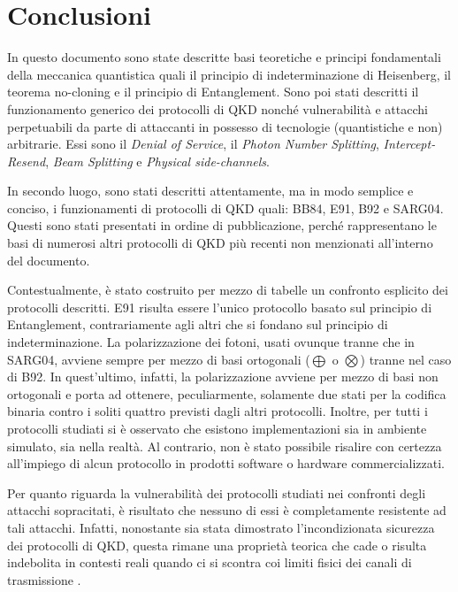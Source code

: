 \chapter{Conclusioni}
\label{chap:conclusioni}
In questo documento sono state descritte basi teoretiche e principi fondamentali della meccanica quantistica quali il principio di indeterminazione di Heisenberg, il teorema no-cloning e il principio di Entanglement. Sono poi stati descritti il funzionamento generico dei protocolli di QKD nonché vulnerabilità e attacchi perpetuabili da parte di attaccanti in possesso di tecnologie (quantistiche e non) arbitrarie. Essi sono il \textit{Denial of Service}, il \textit{Photon Number Splitting}, \textit{Intercept-Resend}, \textit{Beam Splitting} e \textit{Physical side-channels}. 

In secondo luogo, sono stati descritti attentamente, ma in modo semplice e conciso, i funzionamenti di protocolli di QKD quali: BB84, E91, B92 e SARG04. Questi sono stati presentati in ordine di pubblicazione, perché rappresentano le basi di numerosi altri protocolli di QKD più recenti non menzionati all'interno del documento.

Contestualmente, è stato costruito per mezzo di tabelle un confronto esplicito dei protocolli descritti. E91 risulta essere l'unico protocollo basato sul principio di Entanglement, contrariamente agli altri che si fondano sul principio di indeterminazione. La polarizzazione dei fotoni, usati ovunque tranne che in SARG04, avviene sempre per mezzo di basi ortogonali ($\bigoplus$ o $\bigotimes$) tranne nel caso di B92. In quest'ultimo, infatti, la polarizzazione avviene per mezzo di basi non ortogonali e porta ad ottenere, peculiarmente, solamente due stati per la codifica binaria contro i soliti quattro previsti dagli altri protocolli. Inoltre, per tutti i protocolli studiati si è osservato che esistono implementazioni sia in ambiente simulato, sia nella realtà. Al contrario, non è stato possibile risalire con certezza all'impiego di alcun protocollo in prodotti software o hardware commercializzati.

Per quanto riguarda la vulnerabilità dei protocolli studiati nei confronti degli attacchi sopracitati, è risultato che nessuno di essi è completamente resistente ad tali attacchi. Infatti, nonostante sia stata dimostrato l'incondizionata sicurezza dei protocolli di QKD, questa rimane una proprietà teorica che cade o risulta indebolita in contesti reali quando ci si scontra coi limiti fisici dei canali di trasmissione \cite{lo_chau} \cite{scarani_renner}.

